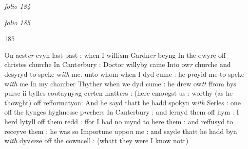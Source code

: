 \documentclass[12pt, a4paper]{book}
\begin{document}
               
\dotfill
						\newpage
{}

\textit{folio 184}


               \vspace*{4cm}
               
\dotfill
						

\textit{folio 185}
            		
            		\begin{flushright}{\color{Mahogany}185}\end{flushright}
            		
            			
			
            			
				\marginpar[\vspace{0.5cm}{\textcolor{Gray}{n}}]{}
			
            			
		\ifthenelse{\isodd{\thepage}}
		{\reversemarginpar}
		{\normalmarginpar}
		On aest\textit{er} evyn last past : when I willi\textit{a}m
            			Gardn\textit{er} beyng In the qwyre off christes churche
            				In Cant\textit{er}bury : Doctor
            					willyby came Into ow\textit{r} churche and desyryd to speke
            			w\textit{ith} me. unto whom when I dyd cume : he p\textit{ra}yid
            			me to speke w\textit{ith} me In my chamber Thyther when we dyd cume : he
            			drew ow\textit{tt} ffrom hys purse ii bylles
            			co\textit{n}tayny\textit{n}g c\textit{er}ten
            			matt\textit{er}s : (here emo\textit{n}gst us : worthy (as he
            			thowght) off refformatyon: And he sayd thatt he hadd spokyn w\textit{ith}
            			Serles : one off the kynges hyghnesse
            				p\textit{re}chers In Canterbury : and
            			lernyd them off hym : I herd lytyll off them redd : ffor I had no mynd to here
            			them : and reffusyd to receyve them : he was so Importune uppo\textit{n}
            			me : and sayde thatt he hadd byn w\textit{ith} dyv\textit{er}se off
            			the cowncell : (whatt they were I know nott) 
            			
\end{document}
